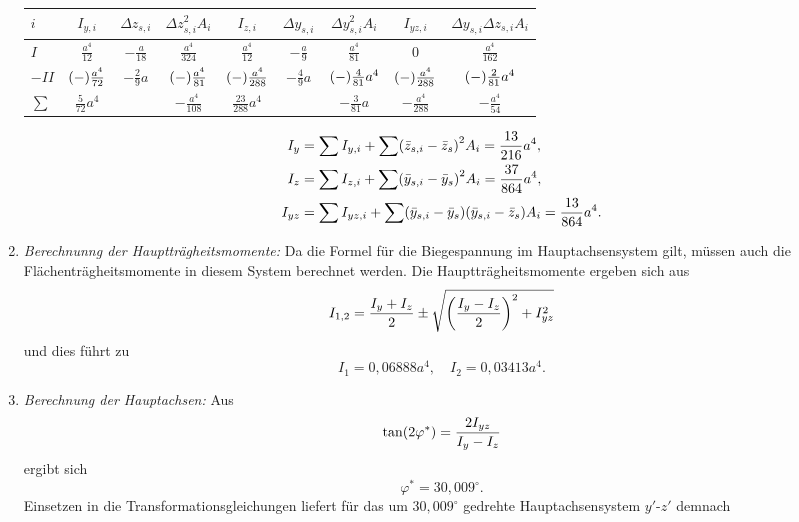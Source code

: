 \documentclass{exercise}
\begin{document}
\begin{enumerate}[label=\arabic*)]
\begin{center}
\begin{tabular}{lcccccccc}
                \toprule
                \(i\) & \(I_{y, i}\) & \(\Delta z_{s, i}\) & \(\Delta z_{s, i}^2 A_i\) & \(I_{z, i}\) & \(\Delta y_{s, i}\) & \(\Delta y_{s, i}^2 A_i\) & \(I_{yz, i}\) & \(\Delta y_{s, i}\Delta z_{s, i}A_i\)\\
                \midrule
                \(I\) & \(\frac{a^4}{12}\) & \(-\frac{a}{18}\) & \(\frac{a^4}{324}\) & \(\frac{a^4}{12}\) & \(-\frac{a}{9}\) & \(\frac{a^4}{81}\) & \(0\) & \(\frac{a^4}{162}\)\\
                \(-II\) & \(\parentheses*{-}\frac{a^4}{72}\) & \(-\frac{2}{9}a\) & \(\parentheses*{-}\frac{a^4}{81}\) & \(\parentheses*{-}\frac{a^4}{288}\) & \(-\frac{4}{9}a\) & \(\parentheses*{-}\frac{4}{81}a^4\) & \(\parentheses*{-}\frac{a^4}{288}\) & \(\parentheses*{-}\frac{2}{81}a^4\)\\
                \midrule
                \(\sum\) & \(\frac{5}{72}a^4\) & & \(-\frac{a^4}{108}\) & \(\frac{23}{288}a^4\) & & \(-\frac{3}{81}a\) & \(-\frac{a^4}{288}\) & \(-\frac{a^4}{54}\)\\
                \bottomrule
            \end{tabular}
        \end{center}
        \begin{align*}
            I_y &= \sum I_{y, i} + \sum\parentheses*{\bar{z}_{s, i} - \bar{z}_s}^2 A_i = \frac{13}{216}a^4,\\
            I_z &= \sum I_{z, i} + \sum\parentheses*{\bar{y}_{s, i} - \bar{y}_s}^2 A_i = \frac{37}{864}a^4,\\
            I_{yz} &= \sum I_{yz, i} + \sum\parentheses*{\bar{y}_{s, i} - \bar{y}_s}\parentheses*{\bar{y}_{s, i} - \bar{z}_s} A_i = \frac{13}{864}a^4.
        \end{align*}
        \item \emph{Berechnunng der Hauptträgheitsmomente:} Da die Formel für die Biegespannung im Hauptachsensystem gilt, müssen auch die Flächenträgheitsmomente in diesem System berechnet werden.
        Die Hauptträgheitsmomente ergeben sich aus
        \[
            I_{1, 2} = \frac{I_y + I_z}{2} \pm \sqrt{\parentheses*{\frac{I_y - I_z}{2}}^2 + I_{yz}^2}
        \]
        und dies führt zu
        \[
            I_1 = 0,06888a^4, \quad I_2 = 0,03413a^4.
        \]
        \item \emph{Berechnung der Hauptachsen:} Aus
        \[
            \tan\parentheses*{2\varphi^*} = \frac{2I_{yz}}{I_y - I_z}
        \]
        ergibt sich
        \[
            \varphi^* = 30,009^\circ.
        \]
        Einsetzen in die Transformationsgleichungen liefert für das um \(30,009^\circ\) gedrehte Hauptachsensystem \(y'\)-\(z'\) demnach

\end{enumerate}
\end{document}
